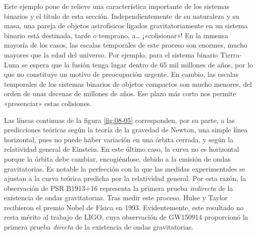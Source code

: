 Este ejemplo pone de relieve una característica importante de los sistemas binarios y el título de esta sección. Independientemente de su naturaleza y su masa, una pareja de objetos astrofísicos ligados gravitatoriamente en un sistema binario está destinada, tarde o temprano, a\ldots{} ¡«colisionar»! En la inmensa mayoría de los casos, las escalas temporales de este proceso son enormes, mucho mayores que la edad del universo. Por ejemplo, para el sistema binario Tierra-Luna se espera que la fusión tenga lugar dentro de 65 mil millones de años, por lo que no constituye un motivo de preocupación urgente. En cambio, las escalas temporales de los sistemas binarios de objetos compactos son mucho menores, del orden de unas decenas de millones de años. Ese plazo más corto nos permite «presenciar» estas colisiones.

Las líneas continuas de la figura \ref{fig:08-05} corresponden, por su parte, a las predicciones teóricas según la teoría de la gravedad de Newton, una simple línea horizontal, pues no puede haber variación en una órbita cerrada, y según la relatividad general de Einstein. En este último caso, la curva no es horizontal porque la órbita debe cambiar, encogiéndose, debido a la emisión de ondas gravitatorias. Es notable la perfección con la que las medidas experimentales se ajustan a la curva teórica predicha por la relatividad general. Por esta razón, la observación de PSR B1913+16 representa la primera prueba \emph{indirecta} de la existencia de ondas gravitatorias. Tras medir este proceso, Hulse y Taylor recibieron el premio Nobel de Física en 1993. Evidentemente, este resultado no resta mérito al trabajo de LIGO, cuya observación de GW150914 proporcionó la primera prueba \emph{directa} de la existencia de ondas gravitatorias.

